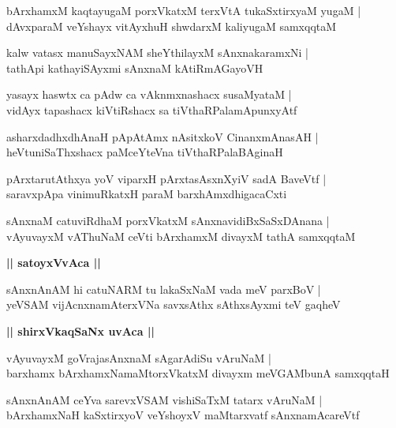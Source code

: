 \documentclass[twoside,12pt,openright]{book}
\newcounter{shloka}[chapter]
\def\uvaca#1{\centerline{{\large\textbf{#1}}}}
\begin{document}
\begin{shloka}%
bArxhamxM kaqtayugaM porxVkatxM terxVtA tukaSxtirxyaM yugaM |\\
dAvxparaM veYshayx vitAyxhuH shwdarxM kaliyugaM samxqqtaM 
\end{shloka}

\begin{shloka}%
kalw vatasx manuSayxNAM sheYthilayxM sAnxnakaramxNi |\\
tathApi kathayiSAyxmi sAnxnaM kAtiRmAGayoVH 
\end{shloka}

\begin{shloka}%
yasayx haswtx ca pAdw ca vAknmxnashacx susaMyataM |\\
vidAyx tapashacx kiVtiRshacx sa tiVthaRPalamApunxyAtf 
\end{shloka}

\begin{shloka}%
asharxdadhxdhAnaH pApAtAmx nAsitxkoV CinanxmAnasAH |\\
heVtuniSaThxshacx paMceYteVna tiVthaRPalaBAginaH 
\end{shloka}

\begin{shloka}%
pArxtarutAthxya yoV viparxH pArxtasAsxnXyiV sadA BaveVtf |\\
saravxpApa vinimuRkatxH paraM barxhAmxdhigacaCxti 
\end{shloka}

\begin{shloka}%
sAnxnaM catuviRdhaM porxVkatxM sAnxnavidiBxSaSxDAnana |\\
vAyuvayxM vAThuNaM ceVti bArxhamxM divayxM tathA samxqqtaM
\end{shloka}

\uvaca{|| satoyxVvAca ||}

\begin{shloka}%
sAnxnAnAM hi catuNARM tu lakaSxNaM vada meV parxBoV |\\
yeVSAM vijAcnxnamAterxVNa savxsAthx sAthxsAyxmi teV gaqheV 
\end{shloka}

\uvaca{|| shirxVkaqSaNx uvAca ||}

\begin{shloka}%
vAyuvayxM goVrajasAnxnaM sAgarAdiSu vAruNaM |\\
barxhamx bArxhamxNamaMtorxVkatxM divayxm meVGAMbunA samxqqtaH 
\end{shloka}

\begin{shloka}%
sAnxnAnAM ceYva sarevxVSAM vishiSaTxM tatarx vAruNaM |\\
bArxhamxNaH kaSxtirxyoV veYshoyxV maMtarxvatf sAnxnamAcareVtf 
\end{shloka}
\end{document}
